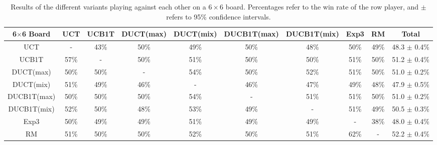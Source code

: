 \documentclass{article}
\begin{document}
\begin{table}[h!]\scriptsize
\centering
\begin{tabular}{|c||c|c|c|c|c|c|c|c||c|}
									\hline
	6$\times$6 Board	& UCT 	& UCB1T		& DUCT(max)	& DUCT(mix)	& DUCB1T(max)	& DUCB1T(mix)	& Exp3 & RM & Total \\ \hline
   UCT &    - & 43\% & 50\% & 49\% & 50\% & 48\% & 50\% & 49\%       & 48.3 $\pm$ 0.4\% \\ \hline 
 UCB1T & 57\% &    - & 50\% & 51\% & 50\% & 50\% & 51\% & 50\%       & 51.2 $\pm$ 0.4\% \\ \hline 
   DUCT(max) & 50\% & 50\% &    - & 54\% & 50\% & 52\% & 51\% & 50\% & 51.0 $\pm$ 0.2\% \\ \hline 
   DUCT(mix) & 51\% & 49\% & 46\% &    - & 46\% & 47\% & 49\% & 48\% & 47.9 $\pm$ 0.5\% \\ \hline 
 DUCB1T(max) & 50\% & 50\% & 50\% & 54\% &    - & 51\% & 51\% & 50\% & 51.0 $\pm$ 0.2\% \\ \hline 
 DUCB1T(mix) & 52\% & 50\% & 48\% & 53\% & 49\% &    - & 51\% & 49\% & 50.5 $\pm$ 0.3\% \\ \hline 
      Exp3 & 50\% & 49\% & 49\% & 51\% & 49\% & 49\% &    - & 38\%   & 48.0 $\pm$ 0.4\% \\ \hline 
        RM & 51\% & 50\% & 50\% & 52\% & 50\% & 51\% & 62\% &    -   & 52.2 $\pm$ 0.4\% \\ \hline 
\end{tabular}
\caption{Results of the different variants playing against each other on a $6\times6$ board. 
Percentages refer to the win rate of the row player, and $\pm$ refers to 95\% confidence intervals.}
\label{table:rr_small}
\end{table}
\end{document}
